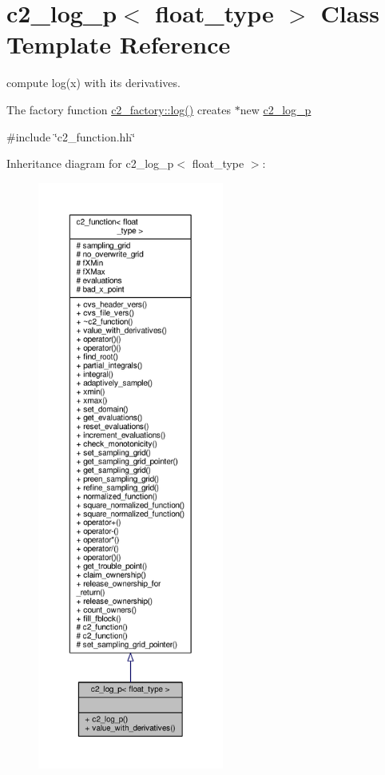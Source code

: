 \hypertarget{classc2__log__p}{}\section{c2\+\_\+log\+\_\+p$<$ float\+\_\+type $>$ Class Template Reference}
\label{classc2__log__p}


compute log(x) with its derivatives.

The factory function \hyperlink{classc2__factory_af20c7c4fee421c8ee0b51bac1c42302e}{c2\+\_\+factory\+::log()} creates $\ast$new \hyperlink{classc2__log__p}{c2\+\_\+log\+\_\+p}  




{\ttfamily \#include \char`\"{}c2\+\_\+function.\+hh\char`\"{}}



Inheritance diagram for c2\+\_\+log\+\_\+p$<$ float\+\_\+type $>$\+:
\nopagebreak
\begin{figure}[H]
\begin{center}
\leavevmode
\includegraphics[height=550pt]{classc2__log__p__inherit__graph}
\end{center}
\end{figure}


